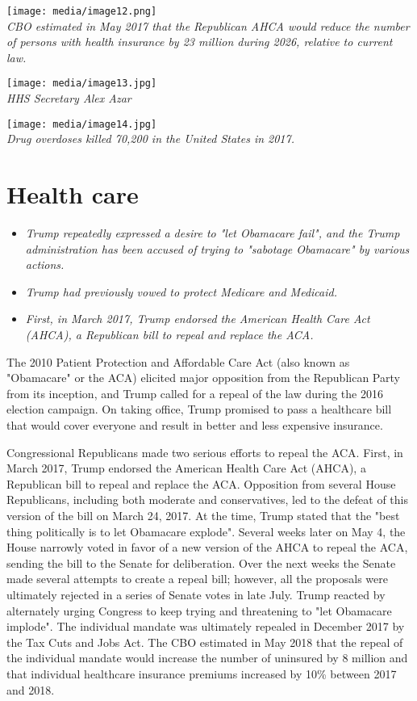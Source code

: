 \texttt{[image: media/image12.png]}\\
\emph{CBO estimated in May 2017 that the Republican AHCA would reduce
the number of persons with health insurance by 23 million during 2026,
relative to current law.}

\texttt{[image: media/image13.jpg]}\\
\emph{HHS Secretary Alex Azar}

\texttt{[image: media/image14.jpg]}\\
\emph{Drug overdoses killed 70,200 in the United States in 2017.}

\section{Health care}\label{health-care}

\begin{itemize}
\item
  \emph{Trump repeatedly expressed a desire to "let Obamacare fail", and
  the Trump administration has been accused of trying to "sabotage
  Obamacare" by various actions.}
\item
  \emph{Trump had previously vowed to protect Medicare and Medicaid.}
\item
  \emph{First, in March 2017, Trump endorsed the American Health Care
  Act (AHCA), a Republican bill to repeal and replace the ACA.}
\end{itemize}

The 2010 Patient Protection and Affordable Care Act (also known as
"Obamacare" or the ACA) elicited major opposition from the Republican
Party from its inception, and Trump called for a repeal of the law
during the 2016 election campaign. On taking office, Trump promised to
pass a healthcare bill that would cover everyone and result in better
and less expensive insurance.

Congressional Republicans made two serious efforts to repeal the ACA.
First, in March 2017, Trump endorsed the American Health Care Act
(AHCA), a Republican bill to repeal and replace the ACA. Opposition from
several House Republicans, including both moderate and conservatives,
led to the defeat of this version of the bill on March 24, 2017. At the
time, Trump stated that the "best thing politically is to let Obamacare
explode". Several weeks later on May 4, the House narrowly voted in
favor of a new version of the AHCA to repeal the ACA, sending the bill
to the Senate for deliberation. Over the next weeks the Senate made
several attempts to create a repeal bill; however, all the proposals
were ultimately rejected in a series of Senate votes in late July. Trump
reacted by alternately urging Congress to keep trying and threatening to
"let Obamacare implode". The individual mandate was ultimately repealed
in December 2017 by the Tax Cuts and Jobs Act. The CBO estimated in May
2018 that the repeal of the individual mandate would increase the number
of uninsured by 8 million and that individual healthcare insurance
premiums increased by 10\% between 2017 and 2018.

